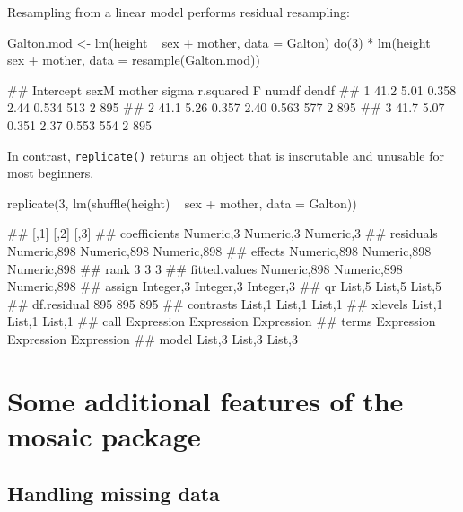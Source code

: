 \noindent
Resampling from a linear model performs residual resampling:

\begin{Schunk}
\begin{Sinput}
Galton.mod <- lm(height ~ sex + mother, data = Galton)
do(3) * lm(height ~ sex + mother, data = resample(Galton.mod))
\end{Sinput}
\begin{Soutput}
##   Intercept sexM mother sigma r.squared   F numdf dendf
## 1      41.2 5.01  0.358  2.44     0.534 513     2   895
## 2      41.1 5.26  0.357  2.40     0.563 577     2   895
## 3      41.7 5.07  0.351  2.37     0.553 554     2   895
\end{Soutput}
\end{Schunk}

\noindent
In contrast, \texttt{replicate()} returns an object that is inscrutable
and unusable for most beginners.

\begin{Schunk}
\begin{Sinput}
replicate(3, lm(shuffle(height) ~ sex + mother, data = Galton))
\end{Sinput}
\begin{Soutput}
##               [,1]        [,2]        [,3]       
## coefficients  Numeric,3   Numeric,3   Numeric,3  
## residuals     Numeric,898 Numeric,898 Numeric,898
## effects       Numeric,898 Numeric,898 Numeric,898
## rank          3           3           3          
## fitted.values Numeric,898 Numeric,898 Numeric,898
## assign        Integer,3   Integer,3   Integer,3  
## qr            List,5      List,5      List,5     
## df.residual   895         895         895        
## contrasts     List,1      List,1      List,1     
## xlevels       List,1      List,1      List,1     
## call          Expression  Expression  Expression 
## terms         Expression  Expression  Expression 
## model         List,3      List,3      List,3
\end{Soutput}
\end{Schunk}

\section{Some additional features of the mosaic
package}\label{some-additional-features-of-the-mosaic-package}

\subsection{Handling missing data}\label{handling-missing-data}

